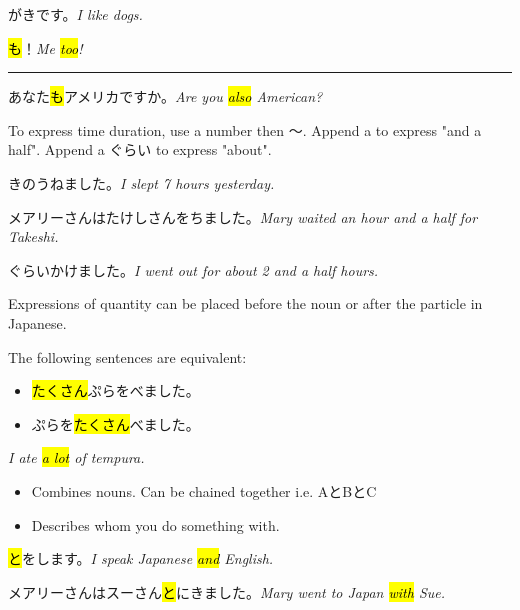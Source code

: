     {
    がきです。\textit{I like dogs.}
    
    \hl{も}！\textit{Me \hl{too}!}
    
    \rule{40mm}{1pt}
    
    あなた\hl{も}アメリカですか。\textit{Are you \hl{also} American?}
    }

    {
    To express time duration, use a number then 〜.
    Append a  to express "and a half".
    Append a ぐらい to express "about".
    
    きのうねました。\textit{I slept 7 hours yesterday.}
    
    メアリーさんはたけしさんをちました。\textit{Mary waited an hour and a half for Takeshi.}
    
    ぐらいかけました。\textit{I went out for about 2 and a half hours.}
    }
    
    {
    Expressions of quantity can be placed before the noun or after the particle in Japanese.
    
    The following sentences are equivalent:
    \begin{itemize}
        \item \hl{たくさん}ぷらをべました。
        \item {}ぷらを\hl{たくさん}べました。
    \end{itemize}
    \textit{I ate \hl{a lot} of tempura.}
    }

    {
    \begin{itemize}
        \item Combines nouns. Can be chained together i.e. AとBとC
        \item Describes whom you do something with.
    \end{itemize}
    
    \hl{と}をします。\textit{I speak Japanese \hl{and} English.}
    
    メアリーさんはスーさん\hl{と}にきました。\textit{Mary went to Japan \hl{with} Sue.}
    }